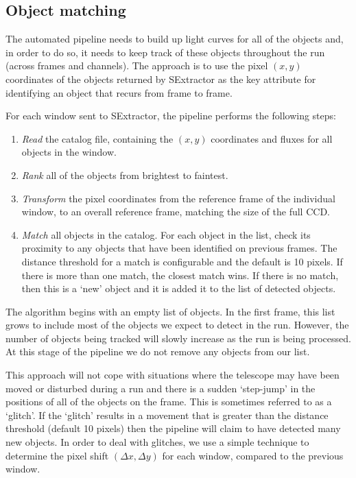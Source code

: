 \subsection{Object matching}
The automated pipeline needs to build up light curves for all of the objects and, in order to do so, it needs to keep track of these objects throughout the run (across frames and channels). The approach is to use the pixel $(x, y)$ coordinates of the objects returned by SExtractor as the key attribute for identifying an object that recurs from frame to frame. 

For each window sent to SExtractor, the pipeline performs the following steps:
\begin{enumerate}
  \item \emph{Read} the catalog file, containing the $(x, y)$ coordinates and fluxes for all objects in the window.
  \item \emph{Rank} all of the objects from brightest to faintest.
  \item \emph{Transform} the pixel coordinates from the reference frame of the individual window, to an overall reference frame, matching the size of the full CCD. 
  \item \emph{Match} all objects in the catalog. For each object in the list, check its proximity to any objects that have been identified on previous frames. The distance threshold for a match is configurable and the default is 10 pixels. If there is more than one match, the closest match wins. If there is no match, then this is a `new' object and it is added it to the list of detected objects.  
\end{enumerate}

The algorithm begins with an empty list of objects. In the first frame, this list grows to include most of the objects we expect to detect in the run. However, the number of objects being tracked will slowly increase as the run is being processed. At this stage of the pipeline we do not remove any objects from our list. 

This approach will not cope with situations where the telescope may have been moved or disturbed during a run and there is a sudden `step-jump' in the positions of all of the objects on the frame. This is sometimes referred to as a `glitch'. If the `glitch' results in a movement that is greater than the distance threshold (default 10 pixels) then the pipeline will claim to have detected many new objects. In order to deal with glitches, we use a simple technique to determine the pixel shift $(\Delta x, \Delta y)$ for each window, compared to the previous window. 

